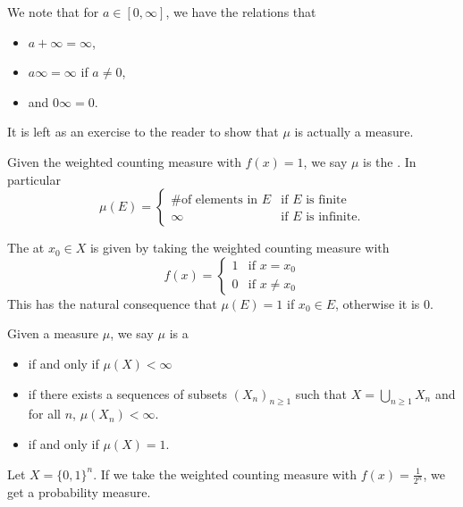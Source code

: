 \documentclass[11pt,leqno,oneside]{amsbook}
\numberwithin{thm}{section}
\begin{document}
\begin{rmk}
We note that for $a \in [0,\infty]$, we have the relations that
\begin{itemize}
\item $a + \infty = \infty$,
\item $a \infty = \infty$ if $a \neq 0$,
\item and $0 \infty = 0$.
\end{itemize}
\end{rmk}
It is left as an exercise to the reader to show that $\mu$ is actually
a measure.
\begin{defn}
  Given the weighted counting measure with $f(x) = 1$, we say $\mu$ is
  the . In particular
\[
    \mu(E) =
    \begin{cases}
      \text{\# of elements in }E&\text{if }E\text{ is finite} \\
      \infty&\text{if }E\text{ is infinite.}
    \end{cases}
  \]
\end{defn}
\begin{defn}
  The  at $x_0 \in X$ is given by taking the
  weighted counting measure with \[
    f(x) =
    \begin{cases}
      1 & \text{if } x = x_0 \\
      0 & \text{if } x \neq x_0
    \end{cases}
  \]
  This has the natural consequence that $\mu(E) = 1$ if $x_0 \in E$,
  otherwise it is 0.
\end{defn}
\begin{defn}
  Given a measure $\mu$, we say $\mu$ is a
  \begin{itemize}
  \item {} if and only if $\mu(X) < \infty$
  \item {} if there exists a sequences of
    subsets $(X_n)_{n \geq 1}$ such that $X = \bigcup_{n \geq 1} X_n$
    and for all $n$, $\mu(X_n) < \infty$.
  \item {} if and only if $\mu(X) = 1$.
  \end{itemize}
\end{defn}
\begin{example}
  Let $X = \{0,1\}^n$. If we take the weighted counting measure with
  $f(x) = \frac{1}{2^n}$, we get a probability measure.
\end{example}
\end{document}
